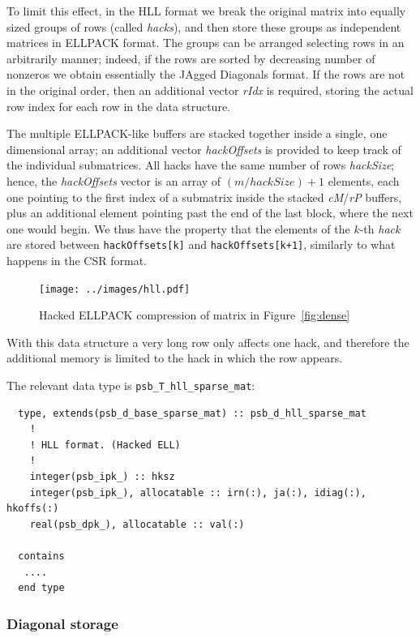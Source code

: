 To limit this effect, in the HLL format  we break the original matrix
into equally sized groups of rows (called \textit{hacks}), and then store
these groups as independent matrices in ELLPACK format. 
The groups can be arranged selecting rows in an arbitrarily manner;
indeed, if the rows are sorted by decreasing number of nonzeros we
obtain essentially the JAgged Diagonals format. 
If the rows are not in the original order, then an   additional vector
\textit{rIdx} is required, storing the actual row index  for each row
in the data structure.

The multiple ELLPACK-like buffers are stacked together inside a
single, one dimensional array; 
an additional  vector \textit{hackOffsets} is provided to keep track
of the individual submatrices.
All hacks have the same number of rows  \textit{hackSize}; hence, 
the \textit{hackOffsets} vector is  an array of
$(m/hackSize)+1$ elements, each one pointing  to the first index of a
submatrix inside the stacked \textit{cM}/\textit{rP} buffers, plus an
additional element pointing past the end of the last block, where the
next one would begin. 
We thus have the property that  
the elements of the $k$-th \textit{hack} are stored between \verb|hackOffsets[k]| and
\verb|hackOffsets[k+1]|, similarly to what happens in the CSR format. 

\begin{figure}[ht]
	\centering
	 \texttt{[image: ../images/hll.pdf]}
	\caption{Hacked ELLPACK compression of matrix in Figure~\ref{fig:dense}}
	\label{fig:hll}
\end{figure} 

With this data structure a very long row only affects one hack, and
therefore the additional memory is limited to the hack in which the
row appears.

The relevant data type is \verb|psb_T_hll_sparse_mat|:
{\small
\begin{lstlisting}
  type, extends(psb_d_base_sparse_mat) :: psb_d_hll_sparse_mat
    !
    ! HLL format. (Hacked ELL) 
    !     
    integer(psb_ipk_) :: hksz
    integer(psb_ipk_), allocatable :: irn(:), ja(:), idiag(:), hkoffs(:)
    real(psb_dpk_), allocatable :: val(:)

  contains
   ....
  end type
\end{lstlisting}
}

\subsubsection*{Diagonal storage}


